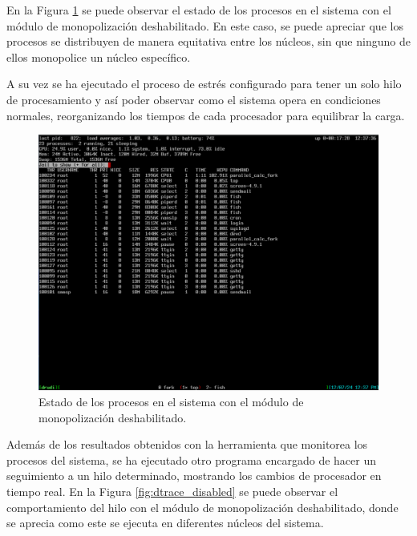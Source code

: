En la Figura \ref{fig:top_disabled} se puede observar el estado de los procesos en el sistema con el módulo de monopolización deshabilitado. En este caso, se puede apreciar que los procesos se distribuyen de manera equitativa entre los núcleos, sin que ninguno de ellos monopolice un núcleo específico.\par

A su vez se ha ejecutado el proceso de estrés configurado para tener un solo hilo de procesamiento y así poder observar como el sistema opera en condiciones normales, reorganizando los tiempos de cada procesador para equilibrar la carga.\par

\begin{figure}[H]
    \centering
    \includegraphics[width=1\textwidth]{images/top_disabled.png}
    \caption{Estado de los procesos en el sistema con el módulo de monopolización deshabilitado.}
    \label{fig:top_disabled}
\end{figure}

Además de los resultados obtenidos con la herramienta que monitorea los procesos del sistema, se ha ejecutado otro programa encargado de hacer un seguimiento a un hilo determinado, mostrando los cambios de procesador en tiempo real. En la Figura \ref{fig:dtrace_disabled} se puede observar el comportamiento del hilo con el módulo de monopolización deshabilitado, donde se aprecia como este se ejecuta en diferentes núcleos del sistema.\par

